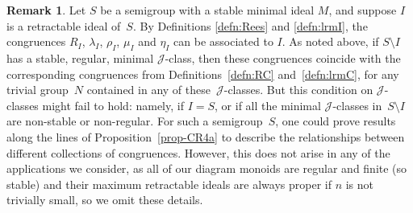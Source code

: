 \documentclass[11pt,a4paper]{article}
\newcommand{\gJ}{\mathrel{\mathscr J}}
\newcommand{\1}{\id_n}
\newcommand{\sm}{\setminus}
\numberwithin{equation}{section}
\theoremstyle{definition}
\newtheorem{rem}[equation]{Remark}
\begin{document}
\begin{rem}
Let $S$ be a semigroup with a stable minimal ideal $M$, and suppose $I$ is a retractable ideal of~$S$.  By Definitions \ref{defn:Rees} and \ref{defn:lrmI}, the congruences $R_I$, $\lambda_I$, $\rho_I$, $\mu_I$ and $\eta_I$ can be associated to $I$.  As noted above, if $S\setminus I$ has a stable, regular, minimal $\gJ$-class, then these congruences coincide with the corresponding congruences from Definitions~\ref{defn:RC} and~\ref{defn:lrmC}, for any trivial group~$N$ contained in any of these~$\gJ$-classes.  But this condition on $\gJ$-classes might fail to hold: namely, if $I=S$, or if all the minimal $\gJ$-classes in~$S\sm I$ are non-stable or non-regular.  For such a semigroup~$S$, one could prove results along the lines of Proposition~\ref{prop-CR4a} to describe the relationships between different collections of congruences.  However, this does not arise in any of the applications we consider, as all of our diagram monoids are regular and finite (so stable) and their maximum retractable ideals are always proper if $n$ is not trivially small, so we omit these details. 
\end{rem}
\end{document}
